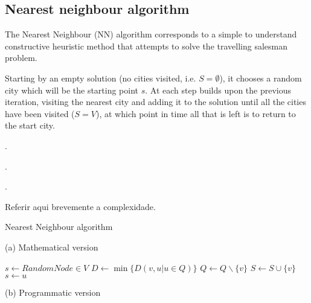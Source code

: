 \subsection{Nearest neighbour algorithm} \label{algorithm-tsp-nn}
The Nearest Neighbour (NN) algorithm corresponds to a simple to understand constructive heuristic method that attempts to solve the travelling salesman problem.\par
Starting by an empty solution (no cities visited, i.e. $S=\emptyset$), it chooses a random city which will be the starting point $s$. At each step builds upon the previous iteration, visiting the nearest city and adding it to the solution until all the cities have been visited ($S = V$), at which point in time all that is left is to return to the start city.\par
\par.\par.\par.\par Referir aqui brevemente a complexidade.

\vspace{-1em}
\begin{center}
    \begin{algorithm}[ht]
        \caption{Nearest Neighbour algorithm}
        \label{alg:nearest neighbour}
        \begin{minipage}[t]{0.49\linewidth}
            (a) Mathematical version
            \begin{algorithmic}[1]
                \State $s \gets RandomNode \in V$
                        \State $D \gets \min\{D(v, u | u \in Q)\}$
                        \State $Q \gets Q \backslash \{v\}$
                        \State $S \gets S \cup \{v\}$ 
                        \State $s \gets u$ 
                    \EndWhile
                    \State {}
                \EndFunction
            \end{algorithmic}
        \end{minipage}
        \begin{minipage}[t]{0.49\linewidth}
            (b) Programmatic version
            
        \end{minipage}
    \end{algorithm}
\end{center}

